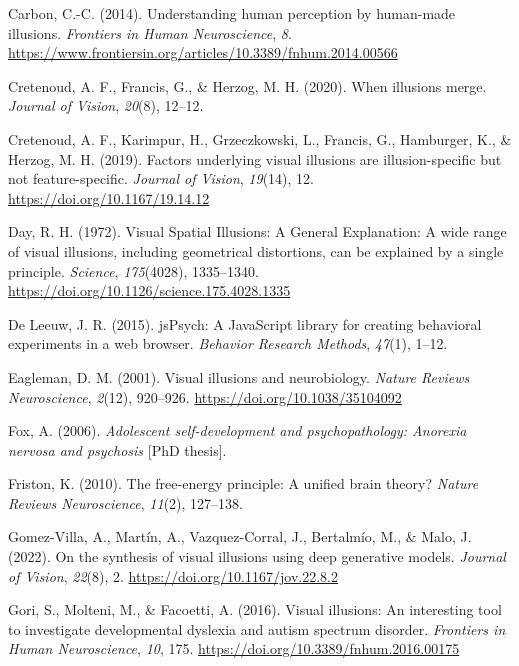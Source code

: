 \documentclass[
  man,floatsintext]{apa6}
\newlength{\cslhangindent}
\newlength{\cslentryspacingunit} %
\newenvironment{CSLReferences}[2] %
 {%
  \setlength{\parindent}{0pt}
  \ifodd #1
  \let\oldpar\par
  \def\par{\hangindent=\cslhangindent\oldpar}
  \fi
  \setlength{\parskip}{#2\cslentryspacingunit}
 }%
 {}
\begin{document}
\begin{CSLReferences}{1}{0}
\leavevmode{}%
Carbon, C.-C. (2014). Understanding human perception by human-made illusions. \emph{Frontiers in Human Neuroscience}, \emph{8}. \url{https://www.frontiersin.org/articles/10.3389/fnhum.2014.00566}

\leavevmode{}%
Cretenoud, A. F., Francis, G., \& Herzog, M. H. (2020). When illusions merge. \emph{Journal of Vision}, \emph{20}(8), 12--12.

\leavevmode{}%
Cretenoud, A. F., Karimpur, H., Grzeczkowski, L., Francis, G., Hamburger, K., \& Herzog, M. H. (2019). Factors underlying visual illusions are illusion-specific but not feature-specific. \emph{Journal of Vision}, \emph{19}(14), 12. \url{https://doi.org/10.1167/19.14.12}

\leavevmode{}%
Day, R. H. (1972). Visual Spatial Illusions: A General Explanation: A wide range of visual illusions, including geometrical distortions, can be explained by a single principle. \emph{Science}, \emph{175}(4028), 1335--1340. \url{https://doi.org/10.1126/science.175.4028.1335}

\leavevmode{}%
De Leeuw, J. R. (2015). jsPsych: A JavaScript library for creating behavioral experiments in a web browser. \emph{Behavior Research Methods}, \emph{47}(1), 1--12.

\leavevmode{}%
Eagleman, D. M. (2001). Visual illusions and neurobiology. \emph{Nature Reviews Neuroscience}, \emph{2}(12), 920--926. \url{https://doi.org/10.1038/35104092}

\leavevmode{}%
Fox, A. (2006). \emph{Adolescent self-development and psychopathology: Anorexia nervosa and psychosis} {[}PhD thesis{]}.

\leavevmode{}%
Friston, K. (2010). The free-energy principle: A unified brain theory? \emph{Nature Reviews Neuroscience}, \emph{11}(2), 127--138.

\leavevmode{}%
Gomez-Villa, A., Martín, A., Vazquez-Corral, J., Bertalmío, M., \& Malo, J. (2022). On the synthesis of visual illusions using deep generative models. \emph{Journal of Vision}, \emph{22}(8), 2. \url{https://doi.org/10.1167/jov.22.8.2}

\leavevmode{}%
Gori, S., Molteni, M., \& Facoetti, A. (2016). Visual illusions: An interesting tool to investigate developmental dyslexia and autism spectrum disorder. \emph{Frontiers in Human Neuroscience}, \emph{10}, 175. \url{https://doi.org/10.3389/fnhum.2016.00175}


\end{CSLReferences}
\end{document}
